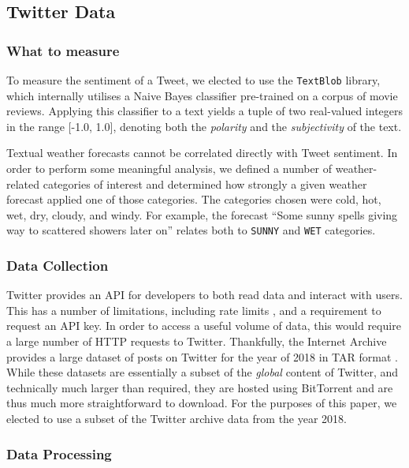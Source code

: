 \documentclass[a4paper,10pt]{article}
\begin{document}
    \subsection{Twitter Data}

    \subsubsection{What to measure}

    To measure the sentiment of a Tweet, we elected to use the \texttt{TextBlob}  library, which internally utilises a Naive Bayes classifier pre-trained on a corpus of movie reviews. Applying this classifier to a text yields a tuple of two real-valued integers in the range [-1.0, 1.0], denoting both the \textit{polarity} and the \textit{subjectivity} of the text.

    Textual weather forecasts cannot be correlated directly with Tweet sentiment. In order to perform some meaningful analysis, we defined a number of weather-related categories of interest and determined how strongly a given weather forecast applied one of those categories. The categories chosen were cold, hot, wet, dry, cloudy, and windy. For example, the forecast ``Some sunny spells giving way to scattered showers later on'' relates both to \texttt{SUNNY} and \texttt{WET} categories.

    \subsubsection{Data Collection}

    Twitter provides an API for developers to both read data and interact with users. This has a number of limitations, including rate limits , and a requirement to request an API key. In order to access a useful volume of data, this would require a large number of HTTP requests to Twitter. Thankfully, the Internet Archive provides a large dataset of posts on Twitter for the year of 2018 in TAR format . While these datasets are essentially a subset of the \textit{global} content of Twitter, and technically much larger than required, they are hosted using BitTorrent and are thus much more straightforward to download. For the purposes of this paper, we elected to use a subset of the Twitter archive data from the year 2018.

    \subsubsection{Data Processing}
\end{document}
